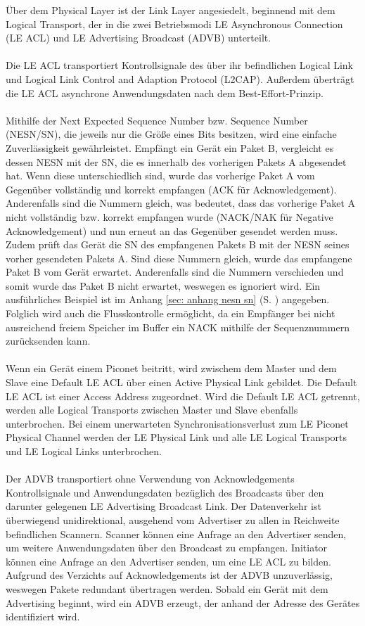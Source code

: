 Über dem Physical Layer ist der Link Layer angesiedelt, beginnend mit dem Logical Transport, der in die zwei Betriebsmodi LE Asynchronous Connection (LE ACL) und LE Advertising Broadcast (ADVB) unterteilt.
\\\\
Die LE ACL transportiert Kontrollsignale des über ihr befindlichen Logical Link und Logical Link Control and Adaption Protocol (L2CAP). Außerdem überträgt die LE ACL asynchrone Anwendungsdaten nach dem Best-Effort-Prinzip.
\\\\
Mithilfe der Next Expected Sequence Number bzw. Sequence Number (NESN/SN), die jeweils nur die Größe eines Bits besitzen, wird eine einfache Zuverlässigkeit gewährleistet. Empfängt ein Gerät ein Paket B, vergleicht es dessen NESN mit der SN, die es innerhalb des vorherigen Pakets A abgesendet hat. Wenn diese unterschiedlich sind, wurde das vorherige Paket A vom Gegenüber vollständig und korrekt empfangen (ACK für Acknowledgement). Anderenfalls sind die Nummern gleich, was bedeutet, dass das vorherige Paket A nicht vollständig bzw. korrekt empfangen wurde (NACK/NAK für Negative Acknowledgement) und nun erneut an das Gegenüber gesendet werden muss. Zudem prüft das Gerät die SN des empfangenen Pakets B mit der NESN seines vorher gesendeten Pakets A. Sind diese Nummern gleich, wurde das empfangene Paket B vom Gerät erwartet. Anderenfalls sind die Nummern verschieden und somit wurde das Paket B nicht erwartet, weswegen es ignoriert wird. Ein ausführliches Beispiel ist im Anhang \ref{sec: anhang nesn sn} (S. \pageref{sec: anhang nesn sn}) angegeben. Folglich wird auch die Flusskontrolle ermöglicht, da ein Empfänger bei nicht ausreichend freiem Speicher im Buffer ein NACK mithilfe der Sequenznummern zurücksenden kann. \cite{BtSpec4.0_2239-2241}
\\\\
Wenn ein Gerät einem Piconet beitritt, wird zwischem dem Master und dem Slave eine Default LE ACL über einen Active Physical Link gebildet. Die Default LE ACL ist einer Access Address zugeordnet. Wird die Default LE ACL getrennt, werden alle Logical Transports zwischen Master und Slave ebenfalls unterbrochen. Bei einem unerwarteten Synchronisationsverlust zum LE Piconet Physical Channel werden der LE Physical Link und alle LE Logical Transports und LE Logical Links unterbrochen.
\\\\
Der ADVB transportiert ohne Verwendung von Acknowledgements Kontrollsignale und Anwendungsdaten bezüglich des Broadcasts über den darunter gelegenen LE Advertising Broadcast Link. Der Datenverkehr ist überwiegend unidirektional, ausgehend vom Advertiser zu allen in Reichweite befindlichen Scannern. Scanner können eine Anfrage an den Advertiser senden, um weitere Anwendungsdaten über den Broadcast zu empfangen. Initiator können eine Anfrage an den Advertiser senden, um eine LE ACL zu bilden. Aufgrund des Verzichts auf Acknowledgements ist der ADVB unzuverlässig, weswegen Pakete redundant übertragen werden. Sobald ein Gerät mit dem Advertising beginnt, wird ein ADVB erzeugt, der anhand der Adresse des Gerätes identifiziert wird. \cite{BtSpec4.0_174-175}
